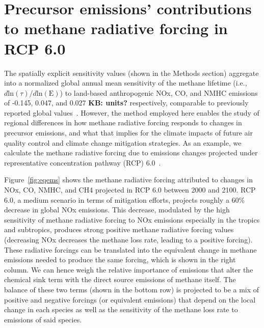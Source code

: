 \section{Precursor emissions' contributions to methane radiative forcing in RCP 6.0}

The spatially explicit sensitivity values (shown in the Methods section) aggregate into a normalized global annual mean sensitivity of the methane lifetime (i.e., $d \mathrm{ln}(\tau)/d\mathrm{ln}(\mathrm{E})$) to land-based anthropogenic NOx, CO, and NMHC emissions of -0.145, 0.047, and 0.027 \textbf{KB: units?} respectively, comparable to previously reported global values~\citep{ref:fry2012,ref:holmes2013}. However, the method employed here enables the study of regional differences in how methane radiative forcing responds to changes in precursor emissions, and what that implies for the climate impacts of future air quality control and climate change mitigation strategies. As an example, we calculate the methane radiative forcing due to emissions changes projected under representative concentration pathway (RCP) 6.0~\citep{ref:vanvuuren2011}.

Figure~\ref{fig:eqems} shows the methane radiative forcing attributed to changes in NOx, CO, NMHC, and CH4 projected in RCP 6.0 between 2000 and 2100. RCP 6.0, a medium scenario in terms of mitigation efforts, projects roughly a 60\% decrease in global NOx emissions. This decrease, modulated by the high sensitivity of methane radiative forcing to NOx emissions especially in the tropics and subtropics, produces strong positive methane radiative forcing values (decreasing NOx decreases the methane loss rate, leading to a positive forcing). These radiative forcings can be translated into the equivalent change in methane emissions needed to produce the same forcing, which is shown in the right column. We can hence weigh the relative importance of emissions that alter the chemical sink term with the direct source emissions of methane itself. The balance of these two terms (shown in the bottom row) is projected to be a mix of positive and negative forcings (or equivalent emissions) that depend on the local change in each species as well as the sensitivity of the methane loss rate to emissions of said species.


